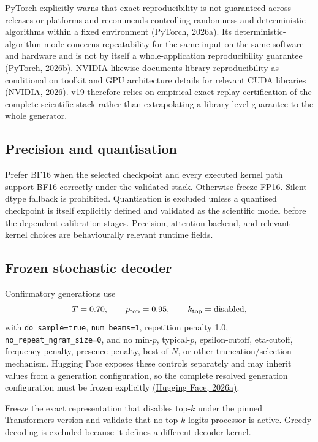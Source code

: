 \documentclass[11pt,a4paper]{article}
\begin{document}
PyTorch explicitly warns that exact reproducibility is not guaranteed across releases or platforms and recommends controlling randomness and deterministic algorithms within a fixed environment \href{https://docs.pytorch.org/docs/stable/notes/randomness.html}{(PyTorch, 2026a)}. Its deterministic-algorithm mode concerns repeatability for the same input on the same software and hardware and is not by itself a whole-application reproducibility guarantee \href{https://docs.pytorch.org/docs/stable/generated/torch.use_deterministic_algorithms.html}{(PyTorch, 2026b)}. NVIDIA likewise documents library reproducibility as conditional on toolkit and GPU architecture details for relevant CUDA libraries \href{https://docs.nvidia.com/cuda/cublas/index.html}{(NVIDIA, 2026)}. v19 therefore relies on empirical exact-replay certification of the complete scientific stack rather than extrapolating a library-level guarantee to the whole generator.

\subsection{Precision and quantisation}
Prefer BF16 when the selected checkpoint and every executed kernel path support BF16 correctly under the validated stack. Otherwise freeze FP16. Silent dtype fallback is prohibited. Quantisation is excluded unless a quantised checkpoint is itself explicitly defined and validated as the scientific model before the dependent calibration stages. Precision, attention backend, and relevant kernel choices are behaviourally relevant runtime fields.

\subsection{Frozen stochastic decoder}\label{sec:decoder}
Confirmatory generations use
\[
T=0.70,\qquad p_{\rm top}=0.95,\qquad k_{\rm top}=\text{disabled},
\]
with \texttt{do\_sample=true}, \texttt{num\_beams=1}, repetition penalty 1.0, \texttt{no\_repeat\_ngram\_size=0}, and no min-$p$, typical-$p$, epsilon-cutoff, eta-cutoff, frequency penalty, presence penalty, best-of-$N$, or other truncation/selection mechanism. Hugging Face exposes these controls separately and may inherit values from a generation configuration, so the complete resolved generation configuration must be frozen explicitly \href{https://huggingface.co/docs/transformers/main_classes/text_generation}{(Hugging Face, 2026a)}.

Freeze the exact representation that disables top-$k$ under the pinned Transformers version and validate that no top-$k$ logits processor is active. Greedy decoding is excluded because it defines a different decoder kernel.
\end{document}
